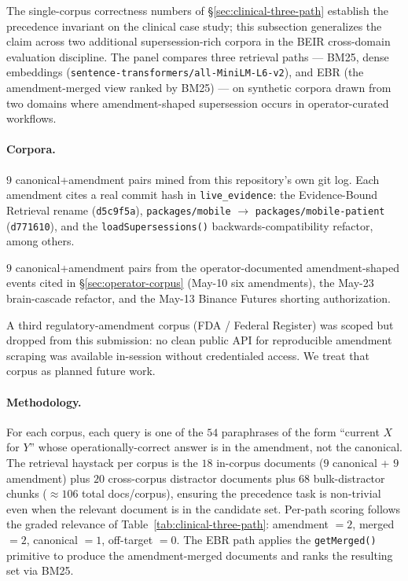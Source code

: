 \documentclass[runningheads]{llncs}
\begin{document}
The single-corpus correctness numbers of
\S\ref{sec:clinical-three-path} establish the precedence invariant on
the clinical case study; this subsection generalizes the claim across
two additional supersession-rich corpora in the
BEIR \cite{thakur2021beir} cross-domain evaluation discipline. The
panel compares three retrieval paths --- BM25, dense embeddings
(\texttt{sentence-transformers/all-MiniLM-L6-v2}), and EBR (the
amendment-merged view ranked by BM25) --- on synthetic corpora drawn
from two domains where amendment-shaped supersession occurs in
operator-curated workflows.

\paragraph{Corpora.}
\begin{description}[leftmargin=1.5em,style=nextline]
  \item[\texttt{refactor-history-memory-oracle}] $9$ canonical+amendment
        pairs mined from this repository's own git log. Each amendment
        cites a real commit hash in \texttt{live\_evidence}: the
        Evidence-Bound Retrieval rename (\texttt{d5c9f5a}),
        \texttt{packages/mobile} $\rightarrow$
        \texttt{packages/mobile-patient} (\texttt{d771610}), and the
        \texttt{loadSupersessions()} backwards-compatibility refactor,
        among others.
  \item[\texttt{trading-substrate-extended}] $9$ canonical+amendment
        pairs from the operator-documented amendment-shaped events
        cited in \S\ref{sec:operator-corpus} (May-10 six amendments),
        the May-23 brain-cascade refactor, and the May-13 Binance
        Futures shorting authorization.
\end{description}
A third regulatory-amendment corpus (FDA / Federal Register) was
scoped but dropped from this submission: no clean public API for
reproducible amendment scraping was available in-session without
credentialed access. We treat that corpus as planned future work.

\paragraph{Methodology.} For each corpus, each query is one of the
$54$ paraphrases of the form ``current $X$ for $Y$'' whose
operationally-correct answer is in the amendment, not the canonical.
The retrieval haystack per corpus is the $18$ in-corpus documents
($9$ canonical + $9$ amendment) plus $20$ cross-corpus distractor
documents plus $68$ bulk-distractor chunks ($\approx{}106$ total
docs/corpus), ensuring the precedence task is non-trivial even when
the relevant document is in the candidate set. Per-path scoring
follows the graded relevance of
Table~\ref{tab:clinical-three-path}: amendment $=2$, merged $=2$,
canonical $=1$, off-target $=0$. The EBR path applies the
\texttt{getMerged()} primitive to produce the amendment-merged
documents and ranks the resulting set via BM25.
\end{document}
